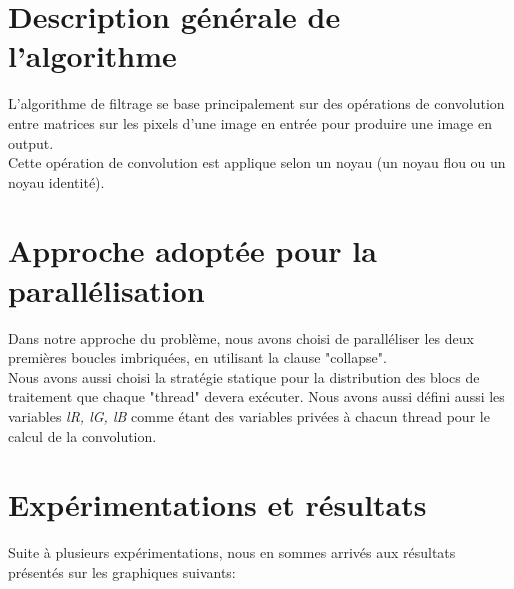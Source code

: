 \documentclass{report}
\begin{document}
\section{Description générale de l'algorithme}
L'algorithme de filtrage se base principalement sur des opérations de convolution entre matrices
 sur les pixels d'une image en entrée pour produire une image en output.\\
Cette opération de convolution est applique selon un noyau (un noyau flou ou un noyau identité).
\section{Approche adoptée pour la parallélisation }
Dans notre approche du problème, nous avons choisi de paralléliser les deux premières
boucles imbriquées, en utilisant la clause "collapse".\\
Nous avons aussi choisi la stratégie statique pour la distribution des blocs de traitement
que chaque "thread" devera exécuter. Nous avons aussi défini aussi les variables {\it lR, lG, lB} 
comme étant des variables privées à chacun thread pour le calcul de la convolution.
\section{Expérimentations et résultats}
Suite à plusieurs expérimentations, nous en sommes arrivés aux résultats présentés sur les graphiques suivants:
\end{document}
